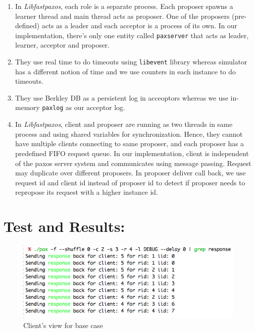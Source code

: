 \begin{enumerate}
\item  In \textit{Libfastpaxos}, each role is a separate process. Each proposer spawns a learner thread and main thread acts as proposer. One of the proposers (pre-defined) acts as a leader and each acceptor is a process of its own. In our implementation, there's only one entity called \texttt{paxserver} that acts as leader, learner, acceptor and proposer.
\item They use real time to do timeouts using \texttt{libevent} library whereas simulator has a different notion of time and we use counters in each instance to do timeouts.
\item They use Berkley DB as a persistent log in acceoptors whereas we use in-memory \texttt{paxlog} as our acceptor log.
\item In \textit{Libfastpaxos}, client and proposer are running as two threads in same process and using shared variables for synchronization. Hence, they cannot have multiple clients connecting to same proposer, and each proposer has a predefined FIFO request queue. In our implementation, client is independent of the paxos server system and communicates using message passing. Request may duplicate over different proposers. In proposer deliver call back, we use request id and client id instead of proposer id to detect if proposer needs to repropose its request with a higher instance id.
\end{enumerate}

\section{Test and Results:}
\begin{figure}[ht!]
\centering
\includegraphics[width=160mm]{base_case.png}
\caption{Client's view for base case}
\label{basecase1}
\end{figure}


